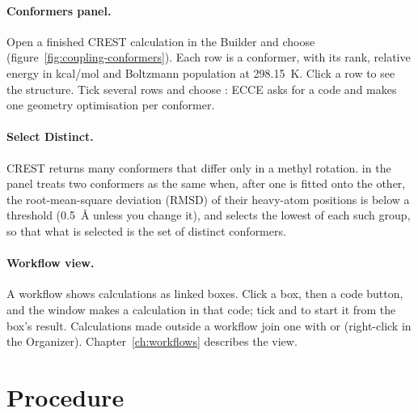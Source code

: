 \paragraph{Conformers panel.} Open a finished CREST calculation in the Builder and choose  (figure~\ref{fig:coupling-conformers}). Each row is a conformer, with its rank, relative energy in kcal/mol and Boltzmann population at 298.15~K. Click a row to see the structure. Tick several rows and choose : ECCE asks for a code and makes one geometry optimisation per conformer.

\paragraph{Select Distinct.} CREST returns many conformers that differ only in a methyl rotation.  in the  panel treats two conformers as the same when, after one is fitted onto the other, the root-mean-square deviation (RMSD) of their heavy-atom positions is below a threshold (\SI{0.5}{\angstrom} unless you change it), and selects the lowest of each such group, so that what is selected is the set of distinct conformers.

\paragraph{Workflow view.} A workflow shows calculations as linked boxes. Click a box, then a code button, and the  window makes a calculation in that code; tick  and  to start it from the box's result. Calculations made outside a workflow join one with  or  (right-click in the Organizer). Chapter~\ref{ch:workflows} describes the view.

\section{Procedure}

